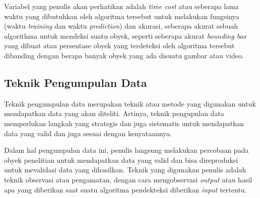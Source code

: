 \documentclass[a4paper]{article}
\begin{document}
Variabel yang penulis akan perhatikan adalah \textit{time cost} atau seberapa lama waktu yang dibutuhkan oleh algoritma tersebut untuk melakukan fungsinya (waktu \textit{training} dan waktu \textit{prediction}) dan akurasi, seberapa akurat sebuah algorithma untuk mendeksi suatu obyek, seperti seberapa akurat \textit{bounding box} yang dibuat atau persentase obyek yang terdeteksi oleh algoritma tersebut dibanding dengan berapa banyak obyek yang ada disuatu gambar atau video.


\subsection*{Teknik Pengumpulan Data}
Teknik pengumpulan data merupakan teknik atau metode yang digunakan untuk mendapatkan data yang akan diteliti. Artinya, teknik pengupulan data memperlukan langkah yang strategis dan juga sistematis untuk mendapatkan data yang valid dan juga sesuai dengan kenyataannya\autocite{penerbitdeepublish-2}.

Dalam hal pengumpulan data ini, penulis langsung melakukan percobaan pada obyek penelitian untuk mendapatkan data yang valid dan bisa direproduksi untuk mevalidasi data yang dihasilkan. Teknik yang digunakan penulis adalah teknik observasi atau pengamatan, dengan cara mengobservasi \textit{output} atau hasil apa yang diberikan saat suatu algoritma pendekteksi diberikan \textit{input} tertentu.

\newpage
{}
\printbibliography[title=Referensi]
\end{document}

